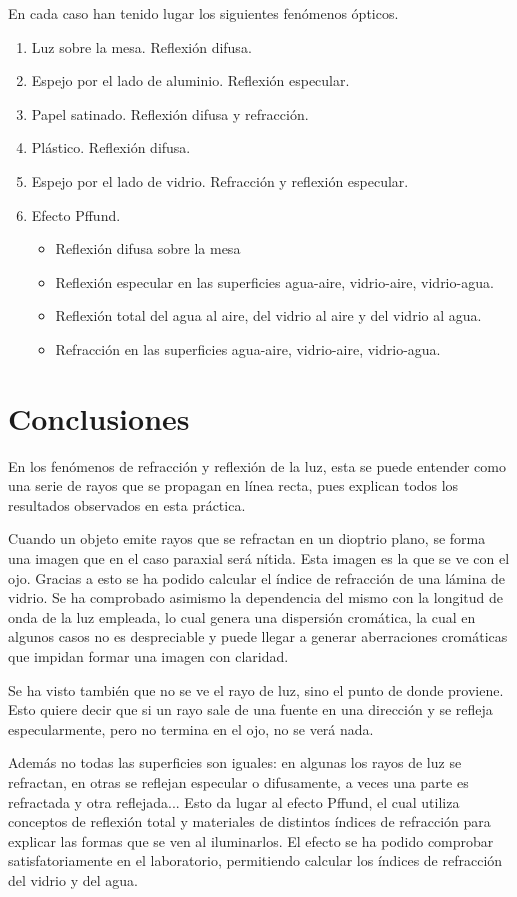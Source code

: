 \documentclass[12pt]{article}
\numberwithin{table}{section}
\numberwithin{figure}{section}
\numberwithin{equation}{section}
\begin{document}
En cada caso han tenido lugar los siguientes fenómenos ópticos.
\begin{enumerate}
	\item Luz sobre la mesa. Reflexión difusa.
	\item Espejo por el lado de aluminio. Reflexión especular.
	\item Papel satinado. Reflexión difusa y refracción.
	\item Plástico. Reflexión difusa.
	\item Espejo por el lado de vidrio. Refracción y reflexión especular.
	\item Efecto Pffund.
		\begin{itemize}
			\item Reflexión difusa sobre la mesa
			\item Reflexión especular en las superficies agua-aire, vidrio-aire, vidrio-agua.
			\item Reflexión total del agua al aire, del vidrio al aire y del vidrio al agua.
			\item Refracción en las superficies agua-aire, vidrio-aire, vidrio-agua.
		\end{itemize}
\end{enumerate}

\section{Conclusiones}
En los fenómenos de refracción y reflexión de la luz, esta se puede entender como una serie de rayos que se propagan en línea recta, pues explican todos los resultados observados en esta práctica.

Cuando un objeto emite rayos que se refractan en un dioptrio plano, se forma una imagen que en el caso paraxial será nítida. Esta imagen es la que se ve con el ojo. Gracias a esto se ha podido calcular el índice de refracción de una lámina de vidrio. Se ha comprobado asimismo la dependencia del mismo con la longitud de onda de la luz empleada, lo cual genera una dispersión cromática, la cual en algunos casos no es despreciable y puede llegar a generar aberraciones cromáticas que impidan formar una imagen con claridad.

Se ha visto también que no se ve el rayo de luz, sino el punto de donde proviene. Esto quiere decir que si un rayo sale de una fuente en una dirección y se refleja especularmente, pero no termina en el ojo, no se verá nada.

Además no todas las superficies son iguales: en algunas los rayos de luz se refractan, en otras se reflejan especular o difusamente, a veces una parte es refractada y otra reflejada... Esto da lugar al efecto Pffund, el cual utiliza conceptos de reflexión total y materiales de distintos índices de refracción para explicar las formas que se ven al iluminarlos. El efecto se ha podido comprobar satisfatoriamente en el laboratorio, permitiendo calcular los índices de refracción del vidrio y del agua.
\end{document}
